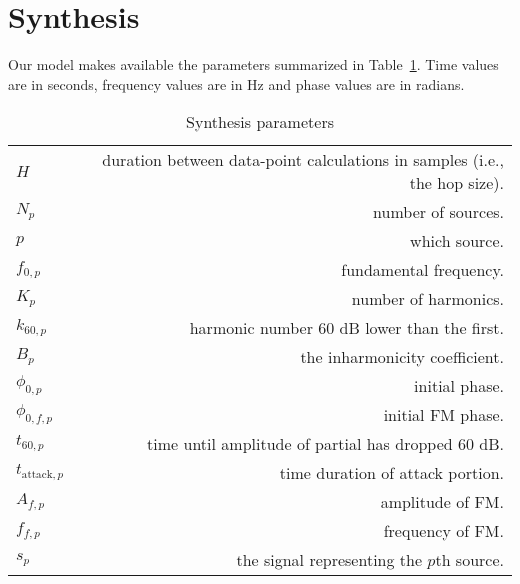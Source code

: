 \section{Synthesis}
Our model makes available the parameters summarized in
Table~\ref{tab:ex2synthparams}. Time values are in seconds,
frequency values are in Hz and phase values are in radians.
\begin{table}
    \begin{tabular}{l r}
        $H$ & duration between data-point calculations in samples (i.e., the hop
        size). \\
        $N_{p}$ & number of sources. \\
        $p$ & which source. \\
        $f_{0,p}$ & fundamental frequency. \\
        $K_{p}$ & number of harmonics. \\
        $k_{60,p}$ & harmonic number 60 dB lower than the first. \\
        $B_{p}$ & the inharmonicity coefficient. \\
        $\phi_{0,p}$ & initial phase. \\
        $\phi_{0,f,p}$ & initial FM phase. \\
        $t_{60,p}$ & time until amplitude of partial has dropped 60 dB. \\
        $t_{\text{attack},p}$ & time duration of attack portion. \\
        $A_{f,p}$ & amplitude of FM. \\
        $f_{f,p}$ & frequency of FM. \\
        $s_{p}$ & the signal representing the $p$th source.
    \end{tabular}
    \caption{Synthesis parameters \label{tab:ex2synthparams}}
\end{table}


